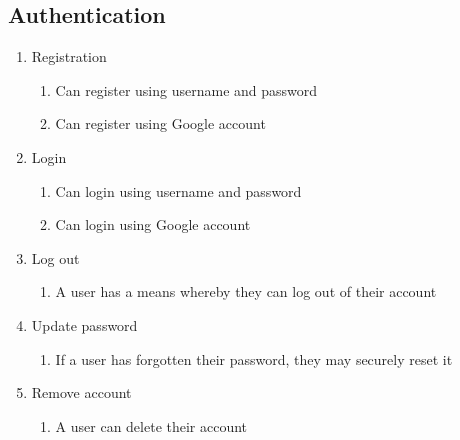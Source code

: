 \documentclass[12pt]{article}
\begin{document}
\subsection{Authentication}
\begin{enumerate}
  \item Registration
        \begin{enumerate}
          \item Can register using username and password
          \item Can register using Google account
        \end{enumerate}
  \item Login
        \begin{enumerate}
          \item Can login using username and password
          \item Can login using Google account
        \end{enumerate}
  \item Log out
        \begin{enumerate}
          \item A user has a means whereby they can log out of their account
        \end{enumerate}
  \item Update password
        \begin{enumerate}
          \item If a user has forgotten their password, they may securely reset it
        \end{enumerate}
  \item Remove account
        \begin{enumerate}
          \item A user can delete their account
        \end{enumerate}
\end{enumerate}
\end{document}
